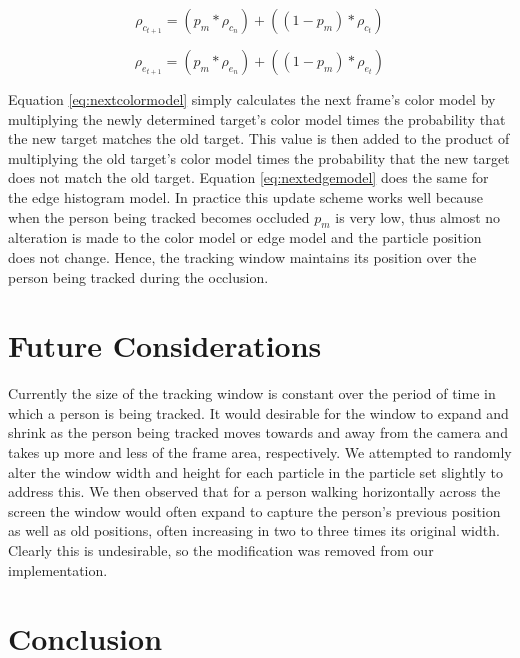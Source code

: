 \documentclass[12pt]{article}
\begin{document}
\begin{equation}
\rho_{c_{t+1}} = (p_m * \rho_{c_{n}}) + ((1-p_m) * \rho_{c_{t}})
\label{eq:nextcolormodel}
\end{equation}

\begin{equation}
\rho_{e_{t+1}} = (p_m * \rho_{e_{n}}) + ((1-p_m) * \rho_{e_{t}})
\label{eq:nextedgemodel}
\end{equation}

Equation \ref{eq:nextcolormodel} simply calculates the next frame's color model by multiplying the newly determined target's color model times the probability that the new target matches the old target. This value is then added to the product of multiplying the old target's color model times the probability that the new target does not match the old target. Equation \ref{eq:nextedgemodel} does the same for the edge histogram model. In practice this update scheme works well because when the person being tracked becomes occluded $p_m$ is very low, thus almost no alteration is made to the color model or edge model and the particle position does not change. Hence, the tracking window maintains its position over the person being tracked during the occlusion.  



\section{Future Considerations}
\label{sec:future}

Currently the size of the tracking window is constant over the period of time in which a person is being tracked. It would desirable for the window to expand and shrink as the person being tracked moves towards and away from the camera and takes up more and less of the frame area, respectively. We attempted to randomly alter the window width and height for each particle in the particle set slightly to address this. We then observed that for a person walking horizontally across the screen the window would often expand to capture the person's previous position as well as old positions, often increasing in two to three times its original width. Clearly this is undesirable, so the modification was removed from our implementation.



\section{Conclusion}
\label{sec:conclusion}


\newpage
\footnotesize


\end{document}
